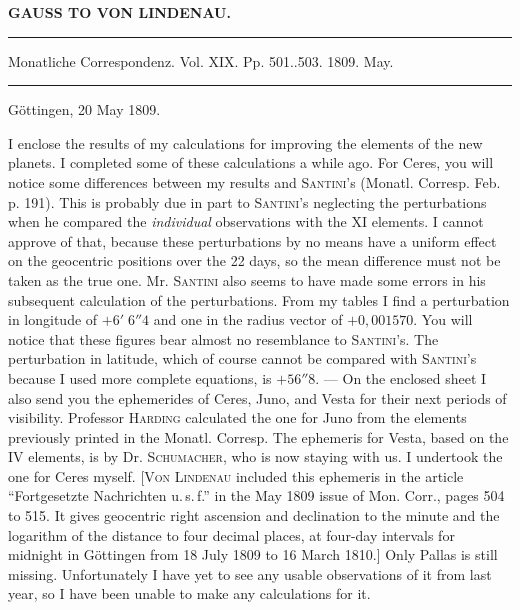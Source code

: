\clearpage
{}
\hypertarget{native-316-lower}{}
\begin{center}
\textbf{GAUSS TO VON LINDENAU.}

\par\vspace{4pt}\hrule\vspace{4pt}
\fontsize{10}{12}\selectfont Monatliche Correspondenz. Vol. XIX. Pp. 501..503. 1809. May.
\par\vspace{4pt}\hrule\vspace{4pt}
\end{center}

\begin{flushright}Göttingen, 20 May 1809.\end{flushright}

\par\indent I enclose the results of my calculations for improving the elements of the new planets. I completed some of these calculations a while ago. For Ceres, you will notice some differences between my results and \textsc{Santini}’s (Monatl. Corresp. Feb. p. 191). This is probably due in part to \textsc{Santini}’s neglecting the perturbations when he compared the \emph{individual} observations with the XI elements. I cannot approve of that, because these perturbations by no means have a uniform effect on the geocentric positions over the 22 days, so the mean difference must not be taken as the true one. Mr. \textsc{Santini} also seems to have made some errors in his subsequent calculation of the perturbations. From my tables I find a perturbation in longitude of $+6'\;6''4$ and one in the radius vector of $+0{,}001570$. You will notice that these figures bear almost no resemblance to \textsc{Santini}’s. The perturbation in latitude, which of course cannot be compared with \textsc{Santini}’s because I used more complete equations, is $+56''8$. — On the enclosed sheet I also send you the ephemerides of Ceres, Juno, and Vesta for their next periods of visibility. Professor \textsc{Harding} calculated the one for Juno from the elements previously printed in the Monatl. Corresp. The ephemeris for Vesta, based on the IV elements, is by Dr. \textsc{Schumacher}, who is now staying with us. I undertook the one for Ceres myself. [\textsc{Von Lindenau} included this ephemeris in the article “Fortgesetzte Nachrichten u.\,s.\,f.” in the May 1809 issue of Mon. Corr., pages 504 to 515. It gives geocentric right ascension and declination to the minute and the logarithm of the distance to four decimal places, at four-day intervals for midnight in Göttingen from 18 July 1809 to 16 March 1810.] Only Pallas is still missing. Unfortunately I have yet to see any usable observations of it from last year, so I have been unable to make any calculations for it.

